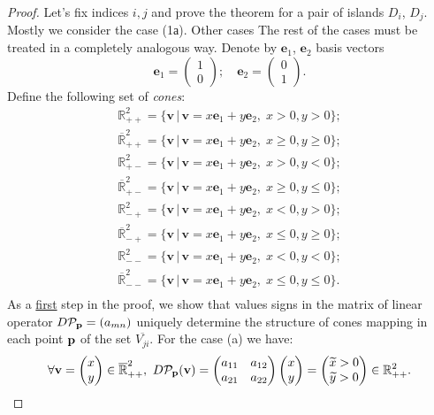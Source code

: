 \begin{proof}
	Let's fix indices $i, j$ and prove the theorem for a pair of islands $D_i$, $D_j$.
	Mostly we consider the case (1а).
	Other cases 
	The rest of the cases must be treated in a completely analogous way.
	Denote by $\mathbf{e}_1$, $\mathbf{e}_2$ basis vectors
	\begin{equation}
		\mathbf{e}_1 = \begin{pmatrix} 1 \\ 0 \end{pmatrix}; \quad \mathbf{e}_2 = \begin{pmatrix} 0 \\ 1 \end{pmatrix}.
	\end{equation}
	Define the following set of {\it cones}:
	\begin{align*}
		\mathbb{R}_{++}^2 = \{ \mathbf{v} \, | \, \mathbf{v} = x \mathbf{e}_1 + y \mathbf{e}_2, \; x > 0, y > 0 \}; \\
		\overline{\mathbb{R}}_{++}^2 = \{ \mathbf{v} \, | \, \mathbf{v} = x \mathbf{e}_1 + y \mathbf{e}_2, \; x \ge 0, y \ge 0 \}; \\
		\mathbb{R}_{+-}^2 = \{ \mathbf{v} \, | \, \mathbf{v} = x \mathbf{e}_1 + y \mathbf{e}_2, \; x > 0, y < 0 \}; \\
		\overline{\mathbb{R}}_{+-}^2 = \{ \mathbf{v} \, | \, \mathbf{v} = x \mathbf{e}_1 + y \mathbf{e}_2, \; x \ge 0, y \le 0 \}; \\
		\mathbb{R}_{-+}^2 = \{ \mathbf{v} \, | \, \mathbf{v} = x \mathbf{e}_1 + y \mathbf{e}_2, \; x < 0, y > 0 \}; \\
		\overline{\mathbb{R}}_{-+}^2 = \{ \mathbf{v} \, | \, \mathbf{v} = x \mathbf{e}_1 + y \mathbf{e}_2, \; x \le 0, y \ge 0 \}; \\
		\mathbb{R}_{--}^2 = \{ \mathbf{v} \, | \, \mathbf{v} = x \mathbf{e}_1 + y \mathbf{e}_2, \; x < 0, y < 0 \}; \\
		\overline{\mathbb{R}}_{--}^2 = \{ \mathbf{v} \, | \, \mathbf{v} = x \mathbf{e}_1 + y \mathbf{e}_2, \; x \le 0, y \le 0 \}. \\
	\end{align*}
	As a \underline{first} step in the proof, we show that values signs in the matrix of linear operator $D \mathcal{P}_{\vb{p}} = ( a_{mn} )$ uniquely determine the structure of cones mapping in each point $\vb{p}$ of the set $\overline{V_{ji}}$.
	For the case (a) we have:
	\begin{equation*}
	\forall \mathbf{v} = \begin{pmatrix} x \\ y \end{pmatrix} \in \overline{\mathbb{R}}_{++}^2, \ D \mathcal{P}_{\vb{p}}(\mathbf{v}) = \begin{pmatrix} a_{11} & a_{12} \\ a_{21} & a_{22} \end{pmatrix} \begin{pmatrix} x \\ y \end{pmatrix} = \begin{pmatrix} \widetilde{x} > 0 \\ \widetilde{y} > 0\end{pmatrix} \in \mathbb{R}_{++}^2.	

\end{equation*}
\end{proof}
